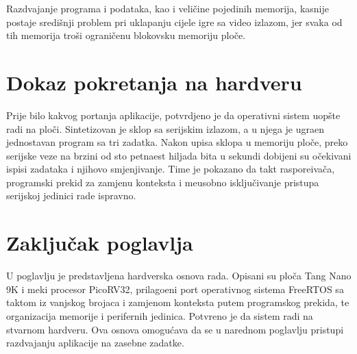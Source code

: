 Razdvajanje programa i podataka, kao i veli\v{c}ine pojedinih memorija, kasnije
postaje sredi\v{s}nji problem pri uklapanju cijele igre sa video izlazom, jer
svaka od tih memorija tro\v{s}i ograni\v{c}enu blokovsku memoriju plo\v{c}e.

\section{Dokaz pokretanja na hardveru}
\label{sec:platforma-boot}

Prije bilo kakvog portanja aplikacije, potvrdjeno je da operativni sistem uop\v{s}te
radi na plo\v{c}i. Sintetizovan je sklop sa serijskim izlazom, a u njega je
ugra\dj{}en jednostavan program sa tri zadatka. Nakon upisa sklopa u memoriju
plo\v{c}e, preko serijske veze na brzini od sto petnaest hiljada bita u sekundi
dobijeni su o\v{c}ekivani ispisi zadataka i njihovo smjenjivanje. Time je
pokazano da takt raspore\dj{}iva\v{c}a, programski prekid za zamjenu konteksta i
me\dj{}usobno isklju\v{c}ivanje pristupa serijskoj jedinici rade ispravno.

\section{Zaklju\v{c}ak poglavlja}
\label{sec:platforma-zakljucak}

U poglavlju je predstavljena hardverska osnova rada. Opisani su plo\v{c}a Tang
Nano 9K i meki procesor PicoRV32, prilago\dj{}eni port operativnog sistema
FreeRTOS sa taktom iz vanjskog brojaca i zamjenom konteksta putem programskog
prekida, te organizacija memorije i perifernih jedinica. Potvr\dj{}eno je da
sistem radi na stvarnom hardveru. Ova osnova omogu\'cava da se u narednom
poglavlju pristupi razdvajanju aplikacije na zasebne zadatke.
